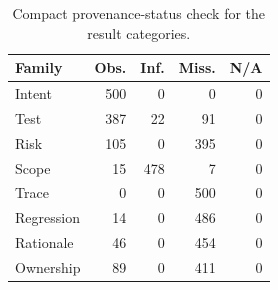 \begin{table}[t]
\centering
\caption{Compact provenance-status check for the result categories.}
\label{tab:provenance-compact}
\footnotesize
\begin{tabular}{@{}lrrrr@{}}
\toprule
Family & Obs. & Inf. & Miss. & N/A \\
\midrule
Intent & 500 & 0 & 0 & 0 \\
Test & 387 & 22 & 91 & 0 \\
Risk & 105 & 0 & 395 & 0 \\
Scope & 15 & 478 & 7 & 0 \\
Trace & 0 & 0 & 500 & 0 \\
Regression & 14 & 0 & 486 & 0 \\
Rationale & 46 & 0 & 454 & 0 \\
Ownership & 89 & 0 & 411 & 0 \\
\bottomrule
\end{tabular}
\end{table}
